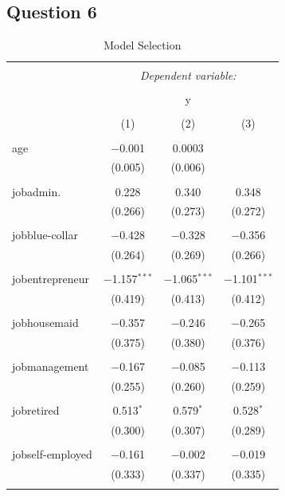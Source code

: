 \documentclass[11pt]{article}
\begin{document}
{\subsection*{Question 6}
\begin{longtable}{@{\extracolsep{5pt}}lccc} 
  \caption{Model Selection} 
  \label{} 
\\[-1.8ex]\hline 
\hline \\[-1.8ex] 
 & \multicolumn{3}{c}{\textit{Dependent variable:}} \\ 
\cline{2-4} 
\\[-1.8ex] & \multicolumn{3}{c}{y} \\ 
\\[-1.8ex] & (1) & (2) & (3)\\ 
\hline \\[-1.8ex] 
 age & $-$0.001 & 0.0003 &  \\ 
  & (0.005) & (0.006) &  \\ 
  & & & \\ 
 jobadmin. & 0.228 & 0.340 & 0.348 \\ 
  & (0.266) & (0.273) & (0.272) \\ 
  & & & \\ 
 jobblue-collar & $-$0.428 & $-$0.328 & $-$0.356 \\ 
  & (0.264) & (0.269) & (0.266) \\ 
  & & & \\ 
 jobentrepreneur & $-$1.157$^{***}$ & $-$1.065$^{***}$ & $-$1.101$^{***}$ \\ 
  & (0.419) & (0.413) & (0.412) \\ 
  & & & \\ 
 jobhousemaid & $-$0.357 & $-$0.246 & $-$0.265 \\ 
  & (0.375) & (0.380) & (0.376) \\ 
  & & & \\ 
 jobmanagement & $-$0.167 & $-$0.085 & $-$0.113 \\ 
  & (0.255) & (0.260) & (0.259) \\ 
  & & & \\ 
 jobretired & 0.513$^{*}$ & 0.579$^{*}$ & 0.528$^{*}$ \\ 
  & (0.300) & (0.307) & (0.289) \\ 
  & & & \\ 
 jobself-employed & $-$0.161 & $-$0.002 & $-$0.019 \\ 
  & (0.333) & (0.337) & (0.335) \\ 
  & & & \\ 

\end{longtable}}
\end{document}
